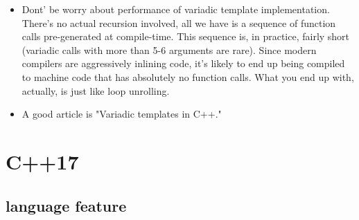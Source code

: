 \documentclass[a4paper,11pt,twoside]{book}
\begin{document}
\begin{itemize}
    \item Dont' be worry about performance of variadic template implementation. There's no actual recursion involved, all we have is a sequence of function calls pre-generated at compile-time. This sequence is, in practice, fairly short (variadic calls with more than 5-6 arguments are rare). Since modern compilers are aggressively inlining code, it's likely to end up being compiled to machine code that has absolutely no function calls. What you end up with, actually, is just like loop unrolling.

    \item A good article is "Variadic templates in C++."

\end{itemize}


\section{C++17}
\subsection{language feature}
\end{document}

